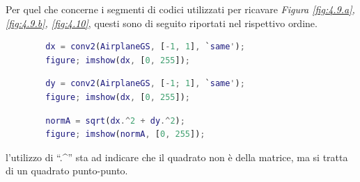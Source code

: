\documentclass{subfiles}
\begin{document}
Per quel che concerne i segmenti di codici utilizzati per ricavare \emph{Figura \ref{fig:4.9.a}, \ref{fig:4.9.b}, \ref{fig:4.10}},
questi sono di seguito riportati nel rispettivo ordine.
\begin{center}
    \begin{lstlisting}[language = MATLAB]
        % caricamento di AirplaneGS.png
        dx = conv2(AirplaneGS, [-1, 1], `same');
        figure; imshow(dx, [0, 255]);
    \end{lstlisting}
    \begin{lstlisting}[language = MATLAB]
        % caricamento di AirplaneGS.png
        dy = conv2(AirplaneGS, [-1; 1], `same');
        figure; imshow(dx, [0, 255]);
    \end{lstlisting}
    \begin{lstlisting}[language = MATLAB]
        % dx e dy sono le immagine sin ora calcolate
        normA = sqrt(dx.^2 + dy.^2);
        figure; imshow(normA, [0, 255]);
    \end{lstlisting}
\end{center}

\begin{Note*}
    l'utilizzo di ``.\textasciicircum '' sta ad indicare che il quadrato non è della matrice, ma si tratta di un quadrato punto-punto.
\end{Note*}
\end{document}
